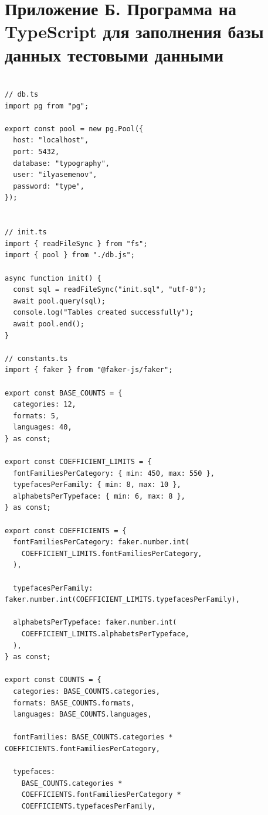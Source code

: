 \section*{Приложение Б. Программа на TypeScript для заполнения базы данных тестовыми данными}

\renewcommand{\theFancyVerbLine}{%
    \scriptsize\ttfamily\textcolor{gray}{\arabic{FancyVerbLine}}%
}

\begin{verbatim}

// db.ts
import pg from "pg";

export const pool = new pg.Pool({
  host: "localhost",
  port: 5432,
  database: "typography",
  user: "ilyasemenov",
  password: "type",
});


// init.ts
import { readFileSync } from "fs";
import { pool } from "./db.js";

async function init() {
  const sql = readFileSync("init.sql", "utf-8");
  await pool.query(sql);
  console.log("Tables created successfully");
  await pool.end();
}

// constants.ts
import { faker } from "@faker-js/faker";

export const BASE_COUNTS = {
  categories: 12,
  formats: 5,
  languages: 40,
} as const;

export const COEFFICIENT_LIMITS = {
  fontFamiliesPerCategory: { min: 450, max: 550 },
  typefacesPerFamily: { min: 8, max: 10 },
  alphabetsPerTypeface: { min: 6, max: 8 },
} as const;

export const COEFFICIENTS = {
  fontFamiliesPerCategory: faker.number.int(
    COEFFICIENT_LIMITS.fontFamiliesPerCategory,
  ),

  typefacesPerFamily: faker.number.int(COEFFICIENT_LIMITS.typefacesPerFamily),

  alphabetsPerTypeface: faker.number.int(
    COEFFICIENT_LIMITS.alphabetsPerTypeface,
  ),
} as const;

export const COUNTS = {
  categories: BASE_COUNTS.categories,
  formats: BASE_COUNTS.formats,
  languages: BASE_COUNTS.languages,

  fontFamilies: BASE_COUNTS.categories * COEFFICIENTS.fontFamiliesPerCategory,

  typefaces:
    BASE_COUNTS.categories *
    COEFFICIENTS.fontFamiliesPerCategory *
    COEFFICIENTS.typefacesPerFamily,


\end{verbatim}

